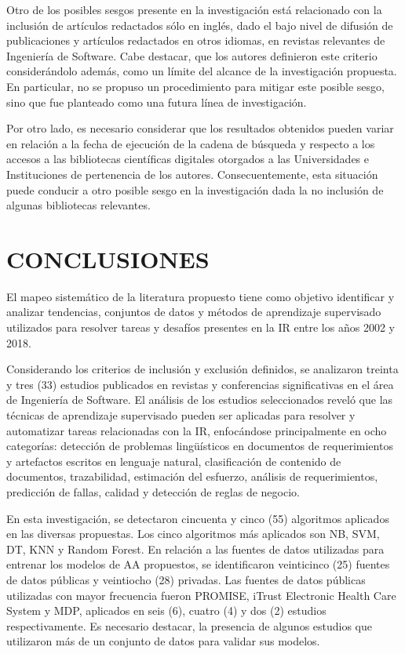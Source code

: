 \documentclass[journal]{IEEEtran}
\begin{document}
Otro de los posibles sesgos presente en la investigación está relacionado con la inclusión de artículos redactados sólo en inglés, dado el bajo nivel de difusión de publicaciones y artículos redactados en otros idiomas, en revistas relevantes de Ingeniería de Software. Cabe destacar, que los autores definieron este criterio considerándolo además, como un límite del alcance de la investigación propuesta. En particular, no se propuso un procedimiento para mitigar este posible sesgo, sino que fue  planteado como una futura línea de investigación.  

Por otro lado, es necesario considerar que los resultados obtenidos pueden variar en relación a la fecha de ejecución de la cadena de búsqueda y respecto a los accesos a las bibliotecas científicas digitales otorgados a las Universidades e Instituciones de pertenencia de los autores. Consecuentemente, esta situación puede conducir a otro posible sesgo en la investigación dada la no inclusión de algunas bibliotecas relevantes.


\section{CONCLUSIONES}

El mapeo sistemático de la literatura propuesto tiene como objetivo identificar y analizar tendencias, conjuntos de datos y métodos de aprendizaje supervisado utilizados para resolver tareas y desafíos presentes en la IR entre los años 2002 y 2018.

Considerando los criterios de inclusión y exclusión definidos, se analizaron treinta y tres (33) estudios publicados en revistas y conferencias significativas en el área de Ingeniería de Software. El análisis de los estudios seleccionados reveló que las técnicas de aprendizaje supervisado pueden ser aplicadas para resolver y automatizar tareas relacionadas con la IR, enfocándose principalmente en ocho categorías: detección de problemas lingüísticos en documentos de requerimientos y artefactos escritos en lenguaje natural, clasificación de contenido de documentos, trazabilidad, estimación del esfuerzo, análisis de requerimientos, predicción de fallas, calidad y detección de reglas de negocio.

En esta investigación, se detectaron cincuenta y cinco (55) algoritmos aplicados en las diversas propuestas. Los cinco algoritmos más aplicados son NB, SVM, DT, KNN y Random Forest.
En relación a las fuentes de datos utilizadas para entrenar los modelos de AA propuestos, se identificaron veinticinco (25) fuentes de datos públicas y veintiocho (28) privadas. Las fuentes de datos públicas utilizadas con mayor frecuencia fueron PROMISE, iTrust Electronic Health Care System y MDP,  aplicados en seis (6), cuatro (4) y dos (2) estudios respectivamente. Es necesario destacar, la presencia de algunos estudios que utilizaron más de un conjunto de datos para validar sus modelos. 
\end{document}
